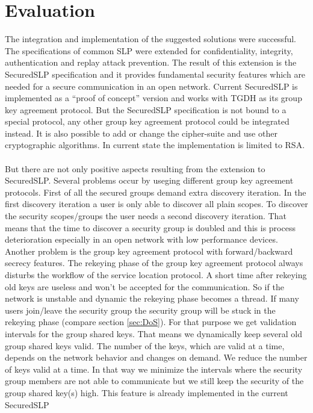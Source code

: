 \section{Evaluation}\label{sec:evaluation}
The integration and implementation of the suggested solutions were successful.
The specifications of common SLP were extended for confidentiality, integrity,
authentication and replay attack prevention. The result of this extension is
the SecuredSLP specification and it provides fundamental security features
which are needed for a secure communication in an open network. Current
SecuredSLP is implemented as a ``proof of concept'' version and works with TGDH
as its group key agreement protocol. But the SecuredSLP specification is not
bound to a special protocol, any other group key agreement protocol could be
integrated instead. It is also possible to add or change the cipher-suite and
use other cryptographic algorithms. In current state the implementation is
limited to RSA.\\\\ But there are not only positive aspects resulting from the
extension to SecuredSLP. Several problems occur by useging different
group key agreement protocols. First of all the secured groups demand extra
discovery iteration. In the first discovery iteration a user is only able to
discover all plain scopes. To discover the security scopes/groups the user
needs a second discovery iteration. That means that the time to discover a
security group is doubled and this is process deterioration especially in an
open network with low performance devices. Another problem is the group key
agreement protocol with forward/backward secrecy features. The rekeying phase of
the group key agreement protocol always disturbs the workflow of the service
location protocol. A short time after rekeying old keys are useless and won't
be accepted for the communication. So if the network is unstable and dynamic
the rekeying phase becomes a thread. If many users join/leave the security
group the security group will be stuck in the rekeying phase (compare section
\ref{sec:DoS}). For that purpose we get validation intervals for the group
shared keys. That means we dynamically keep several old group shared keys
valid. The number of the keys, which are valid at a time, depends on the
network behavior and changes on demand. We reduce the number of keys valid at a
time. In that way we minimize the intervals where the security group members
are not able to communicate but we still keep the security of the group shared
key(s) high. This feature is already implemented in the current SecuredSLP
